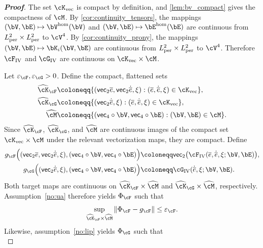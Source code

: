 \begin{proof}[\bf Proof]
The set $\cK_{\mathrm{vec}}$ is compact by definition, and \cref{lem:bv_compact} gives the compactness of $\cM$. By \cref{cor:continuity_tensors}, the mappings $(\bV,\bE)\mapsto \bV^{\rm hom}(\bV)$ and $(\bV,\bE)\mapsto \bE^{\rm hom}(\bE)$ are continuous from $L^2_{\rm per}\times L^2_{\rm per}$ to $\cV^4$. By \cref{cor:continuity_prony}, the mappings $(\bV,\bE)\mapsto \bK_i(\bV,\bE)$ are continuous from $L^2_{\rm per}\times L^2_{\rm per}$ to $\cV^4$. Therefore $\cF_{\mathrm{IV}}$ and $\cG_{\mathrm{IV}}$ are continuous on $\cK_{\mathrm{vec}}\times\cM$.

Let $\varepsilon_{\cF},\varepsilon_{\cG}>0$. Define the compact, flattened sets
\begin{align*}
\widehat{\cK}_{\cF}
&\coloneqq
\{(\mathsf{vec}_2\overline e,\mathsf{vec}_2\dot{\overline e},\xi): (\overline e,\dot{\overline e},\xi)\in \cK_{\mathrm{vec}}\},\\
\widehat{\cK}_{\cG}
&\coloneqq
\{(\mathsf{vec}_2\dot{\overline e},\xi): (\overline e,\dot{\overline e},\xi)\in \cK_{\mathrm{vec}}\},\\
\widehat{\cM}
&\coloneqq
\{(\mathsf{vec}_4\circ\bV,\mathsf{vec}_4\circ\bE): (\bV,\bE)\in\cM\}.
\end{align*}
Since $\widehat{\cK}_{\cF}$, $\widehat{\cK}_{\cG}$, and $\widehat{\cM}$ are continuous images of the compact set $\cK_{\mathrm{vec}}\times\cM$ under the relevant vectorization maps, they are compact. Define
\begin{align*}
g_{\cF}\Bigl((\mathsf{vec}_2\overline e,\mathsf{vec}_2\dot{\overline e},\xi),(\mathsf{vec}_4\circ\bV,\mathsf{vec}_4\circ\bE)\Bigr)
&\coloneqq
\mathsf{vec}_2\bigl(\cF_{\mathrm{IV}}(\overline e,\dot{\overline e},\xi;\bV,\bE)\bigr),\\
g_{\cG}\Bigl((\mathsf{vec}_2\dot{\overline e},\xi),(\mathsf{vec}_4\circ\bV,\mathsf{vec}_4\circ\bE)\Bigr)
&\coloneqq
\cG_{\mathrm{IV}}(\dot{\overline e},\xi;\bV,\bE).
\end{align*}
Both target maps are continuous on $\widehat{\cK}_{\cF}\times\widehat{\cM}$ and $\widehat{\cK}_{\cG}\times\widehat{\cM}$, respectively. Assumption~\ref{no:ua} therefore yields $\Phi_{\cF}$ such that
\begin{equation*}
\sup_{\widehat{\cK}_{\cF}\times\widehat{\cM}}\|\Phi_{\cF}-g_{\cF}\|\le \varepsilon_{\cF}.
\end{equation*}
Likewise, assumption~\ref{no:lip} yields $\Phi_{\cG}$ such that
\begin{equation*}

\end{equation*}
\end{proof}
